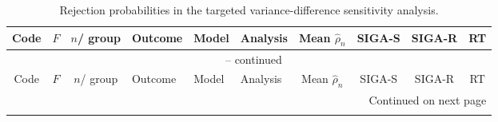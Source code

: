 \documentclass[12pt,a4paper]{article}
\theoremstyle{definition}
\theoremstyle{remark}\newtheorem{remark}{Remark}
\numberwithin{equation}{section}
\begin{document}
\endgroup

\clearpage
\begingroup
\small
\setlength{\tabcolsep}{3.2pt}
\renewcommand{\arraystretch}{0.95}
\setlength{\LTleft}{\fill}
\setlength{\LTright}{\fill}

\begin{longtable}{@{}ccclllcccc@{}}
\caption{Rejection probabilities in the targeted variance-difference sensitivity analysis.}
\label{tab:supp-product-process-sensitivity-results}\\
\toprule
Code & $F$ & \shortstack{$n$/\\group} & Outcome & Model & Analysis &
\shortstack{Mean\\$\widehat\rho_n$} & SIGA-S & SIGA-R & RT \\
\midrule
\endfirsthead

\multicolumn{10}{c}{\tablename\ \thetable{} -- continued}\\
\toprule
Code & $F$ & \shortstack{$n$/\\group} & Outcome & Model & Analysis &
\shortstack{Mean\\$\widehat\rho_n$} & SIGA-S & SIGA-R & RT \\
\midrule
\endhead

\midrule
\multicolumn{10}{r}{Continued on next page}\\
\endfoot

\bottomrule
\endlastfoot


\end{longtable}
\end{document}
